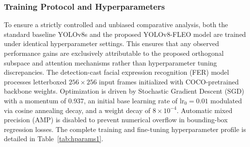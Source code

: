 \documentclass[algorithms,article,submit,moreauthors]{Definitions/mdpi}
\begin{document}
\subsubsection{Training Protocol and Hyperparameters}

To ensure a strictly controlled and unbiased comparative analysis, both the standard baseline YOLOv8s and the proposed YOLOv8-FLEO model are trained under identical hyperparameter settings. This ensures that any observed performance gains are exclusively attributable to the proposed orthogonal subspace and attention mechanisms rather than hyperparameter tuning discrepancies. The detection-cast facial expression recognition (FER) model processes letterboxed $256\times256$ input frames initialized with COCO-pretrained backbone weights. Optimization is driven by Stochastic Gradient Descent (SGD) with a momentum of $0.937$, an initial base learning rate of $\mathrm{lr_0}=0.01$ modulated via cosine annealing decay, and a weight decay of $8\times10^{-4}$. Automatic mixed precision (AMP) is disabled to prevent numerical overflow in bounding-box regression losses. The complete training and fine-tuning hyperparameter profile is detailed in Table~\ref{tab:hparams1}.

\begin{table}[h!]
\centering
\caption{Training and optimization hyperparameters (identical for baseline and FLEO).}
\label{tab:hparams1}
\end{table}
\end{document}
